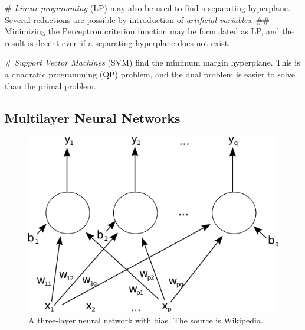 \documentclass[12pt, a4paper]{article}
\begin{document}
\begin{easylist}[itemize]
# \emph{Linear programming} (LP) may also be used to find a separating hyperplane. Several reductions are possible by introduction of \emph{artificial variables}.
## Minimizing the Perceptron criterion function may be formulated as LP, and the result is decent even if a separating hyperplane does not exist.

# \emph{Support Vector Machines} (SVM) find the minimum margin hyperplane.
This is a quadratic programming (QP) problem, and the dual problem is easier to solve than the primal problem.
\end{easylist}


\subsection{Multilayer Neural Networks}

\begin{figure}[ht!]
\centering
\includegraphics[width=0.45\linewidth]{figs/neuralnet}
\caption{A three-layer neural network with bias. The source is Wikipedia.}
\label{fig:neuralnet}
\end{figure}
\end{document}
